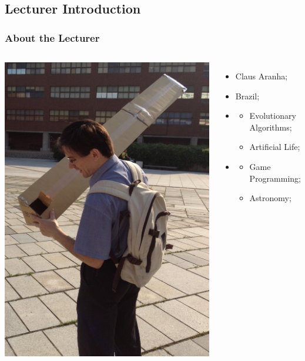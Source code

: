 \subsection{Lecturer Introduction}
\begin{frame}
  \frametitle{About the Lecturer}
  \begin{columns}
    \includegraphics[width=1\textwidth]{../img/pinhole}
    {\small
    \begin{itemize}
      \item {} Claus Aranha;
      \item {} Brazil;
      \item {}
      \begin{itemize}
        \item Evolutionary Algorithms;
        \item Artificial Life;
      \end{itemize}
      \item {}
      \begin{itemize}
        \item Game Programming;
        \item Astronomy;
      \end{itemize}
        \medskip


\end{itemize}}
\end{columns}
\end{frame}
